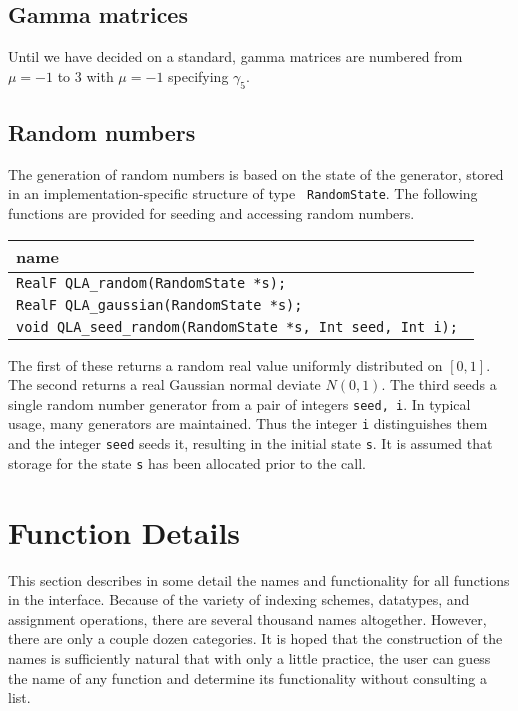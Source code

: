 \documentclass{article}
\begin{document}
\subsection{Gamma matrices}

Until we have decided on a standard, gamma matrices are numbered from
$\mu = -1$ to $3$ with $\mu = -1$ specifying $\gamma_5$.

\subsection{Random numbers}

The generation of random numbers is based on the state of the
generator, stored in an implementation-specific structure of type {\tt
RandomState}.  The following functions are provided for seeding and
accessing random numbers.

\begin{center}
\begin{tabular}{|l|}
\hline
  name               \\
\hline
\verb|RealF QLA_random(RandomState *s);            | \\
\verb|RealF QLA_gaussian(RandomState *s);          | \\
\verb|void QLA_seed_random(RandomState *s, Int seed, Int i); | \\
\hline
\end{tabular}
\end{center}

The first of these returns a random real value uniformly distributed
on $[0,1]$.  The second returns a real Gaussian normal deviate
$N(0,1)$.  The third seeds a single random number generator from a
pair of integers {\tt seed, i}.  In typical usage, many generators are
maintained.  Thus the integer {\tt i} distinguishes them and the
integer {\tt seed} seeds it, resulting in the initial state {\tt s}.
It is assumed that storage for the state {\tt s} has been allocated
prior to the call.


\section{Function Details}
\label{sec:details}

This section describes in some detail the names and functionality for
all functions in the interface.  Because of the variety of indexing
schemes, datatypes, and assignment operations, there are several
thousand names altogether.  However, there are only a couple dozen
categories.  It is hoped that the construction of the names is
sufficiently natural that with only a little practice, the user can
guess the name of any function and determine its functionality without
consulting a list.
\end{document}
